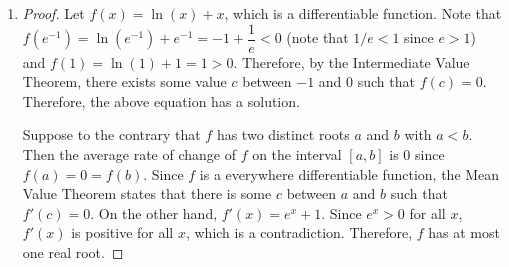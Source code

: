 \documentclass{book}
\begin{document}
\begin{appendices}
\begin{enumerate}[!HW!]
\begin{proof}
Suppose to the contrary that $f$ has two distinct roots $a$ and $b$ with $a< b$. Then the average rate of change of $f$ on the interval $[a,b]$ is 0 since $f(a) = 0 = f(b)$. Since $f$ is a everywhere differentiable function, the Mean Value Theorem states that there is some $c$ between $a$ and $b$ such that $f'(c) = 0$. On the other hand, $f'(x) = e^x+1$. Since $e^x>0$ for all $x$, $f'(x)$ is positive for all $x$, which is a contradiction. Therefore, $f$ has at most one real root.
\end{proof}
\item \begin{proof}
Let $f(x)=\ln(x)+x$, which is a differentiable function. Note that $f(e^{-1}) = \ln(e^{-1}) + e^{-1} = -1+\dfrac{1}{e} < 0$ (note that  $1/e<1$ since $e>1$) and $f(1) = \ln(1)+1 = 1 > 0$. Therefore, by the Intermediate Value Theorem, there exists some value $c$ between $-1$ and $0$ such that $f(c) = 0$. Therefore, the above equation has a solution.

Suppose to the contrary that $f$ has two distinct roots $a$ and $b$ with $a< b$. Then the average rate of change of $f$ on the interval $[a,b]$ is 0 since $f(a) = 0 = f(b)$. Since $f$ is a everywhere differentiable function, the Mean Value Theorem states that there is some $c$ between $a$ and $b$ such that $f'(c) = 0$. On the other hand, $f'(x) = e^x+1$. Since $e^x>0$ for all $x$, $f'(x)$ is positive for all $x$, which is a contradiction. Therefore, $f$ has at most one real root.
\end{proof}
\end{enumerate}
\vspace{-15pt}


\rebootHW


\end{appendices}
\end{document}
